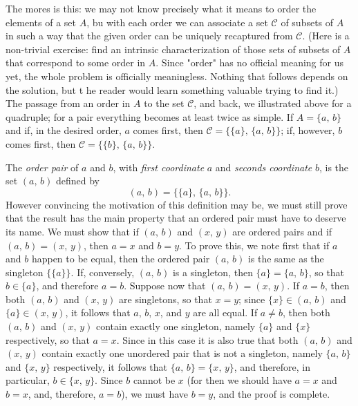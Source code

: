 The mores is this: we may not know precisely what it means to order the elements of a set $A$, bu with each order we can associate a set $\mathcal{C}$ of subsets of $A$ in such a way that the given order can be uniquely recaptured from $\mathcal{C}$. (Here is a non-trivial exercise: find an intrinsic characterization of those sets of subsets of $A$ that correspond to some order in $A$. Since "order" has no official meaning for us yet, the whole problem is officially meaningless. Nothing that follows depends on the solution, but t he reader would learn something valuable trying to find it.) The passage from an order in $A$ to the set $\mathcal{C}$, and back, we illustrated above for a quadruple; for a pair everything becomes at least twice as simple. If $A = \{a, \, b\}$ and if, in the desired order, $a$ comes first, then $\mathcal{C} = \{\{a\}, \, \{a, \, b\}\}$; if, however, $b$ comes first, then $\mathcal{C} = \{\{b\}, \, \{a, \, b\}\}$.

The \textit{order pair} of $a$ and $b$, with \textit{first coordinate} $a$ and \textit{seconds coordinate} $b$, is the set $(a, \, b)$ defined by
\[
	(a, \, b) = \{\{a\}, \, \{a, \, b\}\}.
\]
However convincing the motivation of this definition may be, we must still prove that the result has the main property that an ordered pair must have to deserve its name. We must show that if $(a, \, b)$ and $(x, \, y)$ are ordered pairs and if $(a, \, b) = (x, \, y)$, then $a = x$ and $b = y$. To prove this, we note first that if $a$ and $b$ happen to be equal, then the ordered pair $(a, \, b)$ is the same as the singleton $\{\{a\}\}$. If, conversely, $(a, \, b)$ is a singleton, then $\{a\} = \{a, \, b\}$, so that $b \in \{a\}$, and therefore $a = b$. Suppose now that $(a, \, b) = (x, \, y)$. If $a = b$, then both $(a, \, b)$ and $(x, \, y)$ are singletons, so that $x = y$; since $\{x\} \in (a, \, b)$ and $\{a\} \in (x, \, y)$, it follows that $a, \, b, \, x$, and $y$ are all equal. If $a \neq b$, then both $(a, \, b)$ and $(x, \, y)$ contain exactly one singleton, namely $\{a\}$ and $\{x\}$ respectively, so that $a = x$. Since in this case it is also true that both $(a, \, b)$ and $(x, \, y)$ contain exactly one unordered pair that is not a singleton, namely $\{a, \, b\}$ and $\{x, \, y\}$ respectively, it follows that $\{a, \, b\} = \{x, \, y\}$, and therefore, in particular, $b \in \{x, \, y\}$. Since $b$ cannot be $x$ (for then we should have $a = x$ and $b = x$, and, therefore, $a = b$), we must have $b = y$, and the proof is complete.

